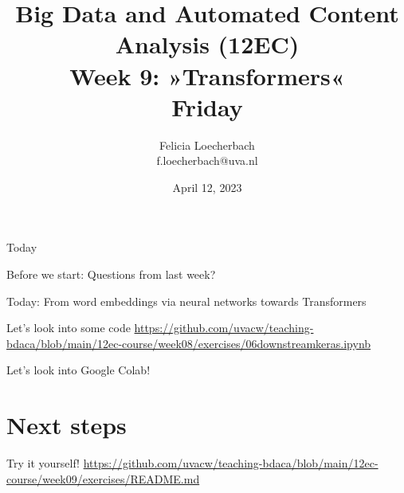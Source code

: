 

\graphicspath{{../../resources/img/}}




\title[Big Data and Automated Content Analysis]{\textbf{Big Data and Automated Content Analysis (12EC)} 
\\Week 9: »Transformers«
\\Friday}
\author[Felicia Loecherbach]{Felicia Loecherbach\\ \footnotesize{f.loecherbach@uva.nl \\}}
\date{April 12, 2023}


\begin{frame}{}
	\titlepage
\end{frame}

\begin{frame}{Today}
	\tableofcontents
\end{frame}
\begin{frame}[standout]
Before we start: Questions from last week?
\end{frame}


\begin{frame}[standout]
Today: From word embeddings via neural networks towards Transformers
\end{frame}




\begin{frame}{Let's look into some code}
\url{https://github.com/uvacw/teaching-bdaca/blob/main/12ec-course/week08/exercises/06downstreamkeras.ipynb}
\end{frame}




\begin{frame}[standout]
Let's look into Google Colab!
\end{frame}


\section{Next steps}
\begin{frame}[standout]
Try it yourself!
\url{https://github.com/uvacw/teaching-bdaca/blob/main/12ec-course/week09/exercises/README.md}
\end{frame}


\begin{frame}
\printbibliography
\end{frame}




